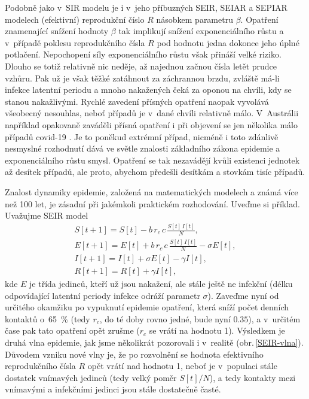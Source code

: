 Podobně jako v~SIR modelu je i v~jeho příbuzných SEIR, SEIAR a SEPIAR modelech (efektivní) reprodukční číslo $R$ násobkem parametru $\beta$. Opatření znamenající snížení hodnoty $\beta$ tak implikují snížení exponenciálního růstu a v~případě poklesu reprodukčního čísla $R$ pod hodnotu jedna dokonce jeho úplné potlačení. Nepochopení síly exponenciálního růstu však přináší velké riziko. Dlouho se totiž relativně nic neděje, až najednou začnou čísla letět prudce vzhůru. Pak už je však těžké zatáhnout za záchrannou brzdu, zvláště má-li infekce latentní periodu a mnoho nakažených čeká za oponou na chvíli, kdy se stanou nakažlivými. Rychlé zavedení přísných opatření naopak vyvolává všeobecný nesouhlas, neboť případů je v~dané chvíli relativně málo. V~Austrálii například opakovaně zaváděli přísná opatření i při objevení se jen několika málo případů covid-19 \cite{australia_opatreni}. Je to poněkud extrémní případ, nicméně i toto zdánlivě nesmyslné rozhodnutí dává ve světle znalosti základního zákona epidemie a exponenciálního růstu smysl. Opatření se tak nezavádějí kvůli existenci jednotek až desítek případů, ale proto, abychom předešli desítkám a stovkám tisíc případů. 

Znalost dynamiky epidemie, založená na matematických modelech a známá více než 100 let, je zásadní při jakémkoli praktickém rozhodování. Uveďme si příklad. Uvažujme SEIR model
\begin{equation}
	\begin{array}{l}
		\displaystyle{S[t+1] = S[t] - b\,r_c\,c \, \frac{S[t]\,I[t]}{N}}, \\[3ex]
		\displaystyle{E[t+1] = E[t] + b\,r_c\,c \, \frac{S[t]\,I[t]}{N} - \sigma E[t]}, \\[3ex]
		\displaystyle{I[t+1] = I[t] + \sigma E[t] - \gamma I[t]}, \\[3ex]
		\displaystyle{R[t+1] = R[t] + \gamma I[t]},
	\end{array}
	\label{SEIR1}
\end{equation}
kde $E$ je třída jedinců, kteří už jsou nakažení, ale stále ještě ne infekční (délku odpovídající latentní periody infekce odráží parametr $\sigma$). Zaveďme nyní od určitého okamžiku po vypuknutí epidemie opatření, která sníží počet denních kontaktů o~65~\% (tedy $r_c$, do té doby rovno jedné, bude nyní $0.35$), a v~určitém čase pak tato opatření opět zrušme ($r_c$ se vrátí na hodnotu 1). Výsledkem je druhá vlna epidemie, jak jsme několikrát pozorovali i v~realitě (obr.\,\ref{SEIR-vlna}). Důvodem vzniku nové vlny je, že po rozvolnění se hodnota efektivního reprodukčního čísla $R$ opět vrátí nad hodnotu 1, neboť je v~populaci stále dostatek vnímavých jedinců (tedy velký poměr $S[t]/N$), a tedy kontakty mezi vnímavými a infekčními jedinci jsou stále dostatečně časté.

